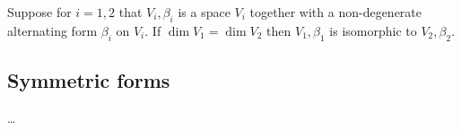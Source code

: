 \documentclass[11pt]{article}
\numberwithin{equation}{section}
\begin{document}
\begin{corollary}
Suppose for \(i=1,2\) that \(V_i,\beta_i\) is a space \(V_i\) together
with a non-degenerate alternating form \(\beta_i\) on \(V_i\).
If \(\dim V_1 = \dim V_2\) then \(V_1,\beta_1\) is isomorphic to
\(V_2,\beta_2\).
\label{corollary:alternating-forms-classified}
\end{corollary}
\subsection{Symmetric forms}
\label{sec:symmetric-forms}
\ldots{}
\end{document}
